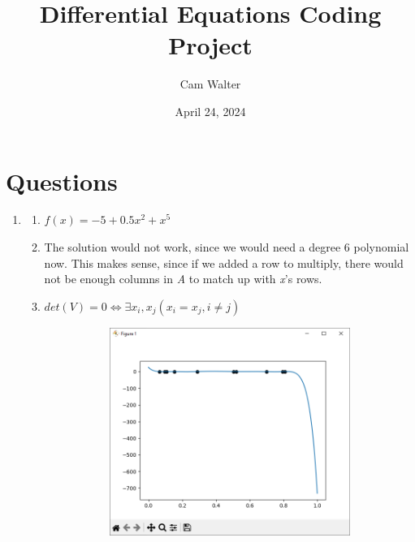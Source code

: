 \documentclass{article}
\title{Differential Equations Coding Project}
\author{Cam Walter}
\date{April 24, 2024}
\begin{document}
\maketitle

\section{Questions}
\begin{enumerate}
      \item
            \begin{enumerate}
                  \item \begin{math}
                              f(x) = -5 + 0.5x^2 + x^5
                        \end{math}
                  \item The solution would not work, since we would need a degree 6
                        polynomial now. This makes sense, since if we added a row to multiply,
                        there would not be enough columns in \textit{A} to match up with \textit{x}'s rows.
                  \item \begin{math}
                              det(V)=0 \iff \exists x_i, x_j (x_i=x_j, i \neq j)
                        \end{math}
                        \begin{figure}[h]
                              \centering
                              \begin{subfigure}{.5\textwidth}
                                    \includegraphics[width=\textwidth, keepaspectratio]{zoomed_out.png}

\end{subfigure}
\end{figure}
\end{enumerate}
\end{enumerate}
\end{document}
